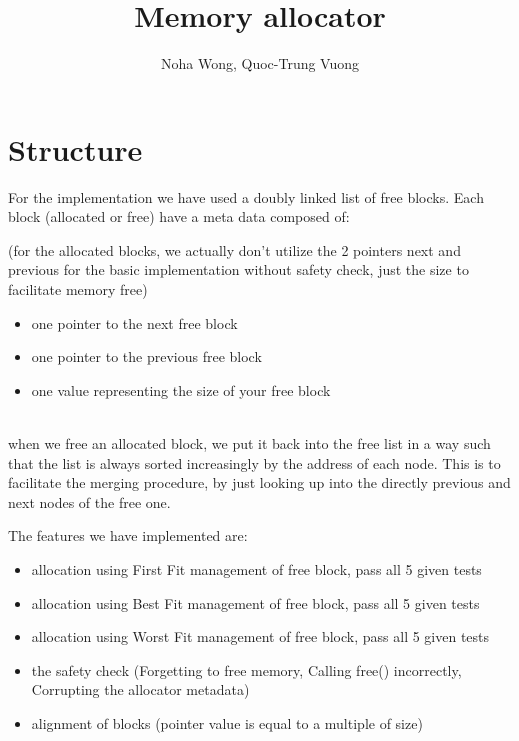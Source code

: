 \documentclass{article}
\title{Memory allocator}
\author{Noha Wong, Quoc-Trung Vuong}
\begin{document}
\maketitle
\newpage

\part{Structure}

For the implementation we have used a doubly linked list of free blocks.
Each block (allocated or free) have a meta data composed of:

(for the allocated blocks, we actually don't utilize the 2 pointers next and previous for the basic implementation without safety check, just the size to facilitate memory free)

\begin{itemize}
\item one pointer to the next free block
\item one pointer to the previous free block
\item one value representing the size of your free block \\ \\
\end{itemize}

when we free an allocated block, we put it back into the free list in a way such that the list is always sorted increasingly by the address of each node. This is to facilitate the merging procedure, by just looking up into the directly previous and next nodes of the free one.

\begin{flushleft}
The features we have implemented are:
\end{flushleft}


\begin{itemize}
\item allocation using First Fit management of free block, pass all 5 given tests
\item allocation using Best Fit management of free block, pass all 5 given tests
\item allocation using Worst Fit management of free block, pass all 5 given tests
\item the safety check (Forgetting to free memory, Calling free() incorrectly, Corrupting the allocator metadata)
\item alignment of blocks (pointer value is equal to a multiple of size)
\end{itemize}
\end{document}
